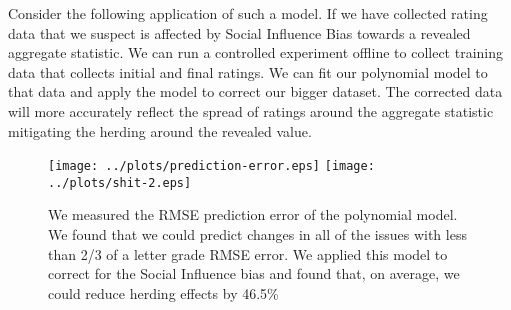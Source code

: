 Consider the following application of such a model.
If we have collected rating data that we suspect is affected by Social Influence Bias towards a revealed aggregate statistic.
We can run a controlled experiment offline to collect training data that collects initial and final ratings.
We can fit our polynomial model to that data and apply the model to correct our bigger dataset.
The corrected data will more accurately reflect the spread of ratings around the aggregate statistic mitigating the herding around the revealed value.

\begin{figure}[h]
\hspace*{-2em}
    \texttt{[image: ../plots/prediction-error.eps]}
    \hspace*{-2em}
    \texttt{[image: ../plots/shit-2.eps]}
      \caption{We measured the RMSE prediction error of the polynomial model. We found that we could predict changes in all of the issues with less than 2/3 of a letter grade RMSE error. We applied this model to correct for the Social Influence bias and found that, on average, we could reduce herding effects by 46.5\%}
      \label{poly-1}
\end{figure}




